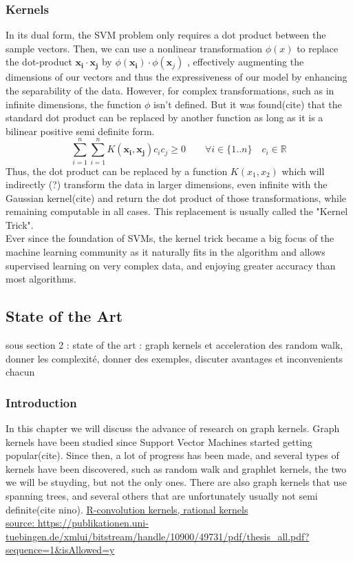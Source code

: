 \documentclass{article}
\let\vec\mathbf
\newcommand*{\R}{%
  \mathbb{R}%
}
\theoremstyle{definition}
\begin{document}
\subsubsection{Kernels}
In its dual form, the SVM problem only requires a dot product between the sample vectors. Then, we can use a nonlinear transformation $\phi(x)$ to replace the dot-product $\vec{x_i} \cdot \vec{x_j}$ by $\phi(\vec{x_{i}})\cdot\phi(\vec{x}_{j})$ , effectively augmenting the dimensions of our vectors and thus the expressiveness of our model by enhancing the separability of the data. However, for complex transformations, such as in infinite dimensions, the function $\phi$ isn't defined. But it was found(cite) that the standard dot product can be replaced by another function as long as it is a bilinear positive semi definite form. 
\begin{equation}
    \sum\limits_{i=1}^{n}\sum\limits_{i=1}^{n}K(\vec{x_{i}},\vec{x_{j}})c_{i}c_{j} \geq 0 \qquad \forall i \in \{1..n\} \quad c_i \in \R
\end{equation}
Thus, the dot product can be replaced by a function $K(x_1,x_2)$ which will indirectly (?) transform the data in larger dimensions, even infinite with the Gaussian kernel(cite) and return the dot product of those transformations, while remaining computable in all cases. This replacement is usually called the "Kernel Trick".\\
Ever since the foundation of SVMs, the kernel trick became a big focus of the machine learning community as it naturally fits in the algorithm and allows supervised learning on very complex data, and enjoying greater accuracy than most algorithms.
\subsection{State of the Art}
sous section 2 : state of the art : graph kernels et acceleration des random walk, donner les complexité, donner des exemples, discuter avantages et inconvenients chacun
\subsubsection{Introduction}
In this chapter we will discuss the advance of research on graph kernels. Graph kernels have been studied since Support Vector Machines started getting popular(cite). Since then, a lot of progress has been made, and several types of kernels have been discovered, such as random walk and graphlet kernels, the two we will be stuyding, but not the only ones. There are also graph kernels that use spanning trees, and several others that are unfortunately usually not semi definite(cite nino).
\url{R-convolution kernels, rational kernels}\\
\url{source: https://publikationen.uni-tuebingen.de/xmlui/bitstream/handle/10900/49731/pdf/thesis_all.pdf?sequence=1&isAllowed=y}
\end{document}
